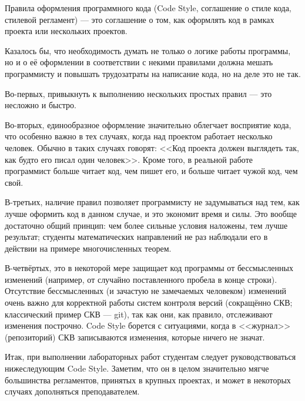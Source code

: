 Правила оформления программного кода (Code Style, соглашение о стиле кода, стилевой регламент) --- это соглашение о том, как оформлять код в рамках проекта или нескольких проектов.

Казалось бы, что необходимость думать не только о логике работы программы, но и о её оформлении в соответствии с некими правилами должна мешать программисту и повышать трудозатраты на написание кода, но на деле это не так.

Во-первых, привыкнуть к выполнению нескольких простых правил --- это несложно и быстро.

Во-вторых, единообразное оформление значительно облегчает восприятие кода, что особенно важно в тех случаях,
когда над проектом работает несколько человек.
Обычно в таких случаях говорят: <<Код проекта должен выглядеть так, как будто его писал один человек>>.
Кроме того, в реальной работе программист больше читает код, чем пишет его, и больше читает чужой код, чем свой.

В-третьих, наличие правил позволяет программисту не задумываться над тем, как лучше оформить код в данном случае, и это экономит время и силы.
Это вообще достаточно общий принцип: чем более сильные условия наложены, тем лучше результат;
студенты математических направлений не раз наблюдали его в действии на примере многочисленных теорем.

В-четвёртых, это в некоторой мере защищает код программы от бессмысленных изменений (например, от случайно поставленного пробела в конце строки).
Отсутствие бессмысленных (и зачастую не замечаемых человеком) изменений очень важно для корректной работы систем контроля версий (сокращённо СКВ; классический пример СКВ --- git), так как они, как правило, отслеживают изменения построчно.
Code Style борется с ситуациями, когда в <<журнал>> (репозиторий) СКВ записываются изменения, которые ничего не значат.

Итак, при выполнении лабораторных работ студентам следует руководствоваться нижеследующим Code Style.
Заметим, что он в целом значительно мягче большинства регламентов, принятых в крупных проектах,
и может в некоторых случаях дополняться преподавателем.


